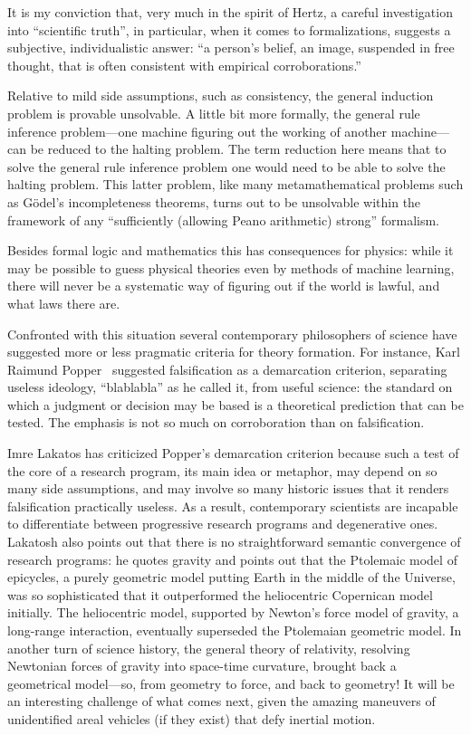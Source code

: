 It is my conviction that, very much in the spirit of Hertz, a careful investigation into ``scientific truth'',
in particular, when it comes to formalizations,
suggests a subjective, individualistic answer:
``a person's belief, an image, suspended in free thought, that is often consistent with empirical corroborations.''

Relative to mild side assumptions, such as consistency, the general induction problem is provable unsolvable.
A little bit more formally,
the general rule inference problem---one machine figuring out the working of another machine---can be reduced to the halting problem.
The term reduction here means that to solve the general rule inference problem one would need to be able to solve the halting problem.
This latter problem, like many metamathematical problems such as G\"odel's incompleteness theorems, turns out to be unsolvable
within the framework of any ``sufficiently (allowing Peano arithmetic) strong'' formalism.

Besides formal logic and mathematics this has consequences for physics:
while it may be possible to guess physical theories even by methods of machine learning, there will never be a systematic way of
figuring out if the world is lawful, and what laws there are.

Confronted with this situation several contemporary philosophers of science have suggested more or less pragmatic criteria
for theory formation.
For instance,
Karl Raimund Popper~\cite{popper-en} suggested falsification as a demarcation criterion, separating useless ideology, ``blablabla'' as he
called it, from useful science: the standard on which a judgment or decision may be based is a theoretical prediction that can be tested.
The emphasis is not so much on corroboration than on falsification.

Imre Lakatos\cite{lakatosch} has criticized Popper's demarcation criterion because such a test of the core of a research program,
its main idea or metaphor,
may depend on so many side assumptions, and may involve so many historic issues that it renders falsification practically useless.
As a result, contemporary scientists are incapable to differentiate between progressive research programs and degenerative ones.
Lakatosh also points out that there is no straightforward semantic  convergence of research programs: he
quotes gravity and points out that the Ptolemaic model of epicycles, a purely geometric model putting Earth in the middle of the Universe,
was so sophisticated that it outperformed the heliocentric Copernican model initially.
The heliocentric model, supported by Newton's force model of gravity, a long-range interaction, eventually superseded the Ptolemaian geometric model.
In another turn of science history, the general theory of relativity, resolving Newtonian forces of gravity into
space-time curvature, brought back a geometrical model---so, from geometry to force, and back to geometry!
It will be an interesting challenge of what comes next,
given the amazing  maneuvers of unidentified areal vehicles (if they exist)
that defy inertial motion.


